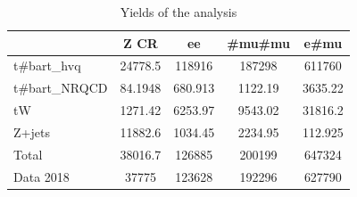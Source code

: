 \documentclass[10pt]{article}
\begin{document}
\begin{table}[htbp]
\begin{center}
\begin{tabular}{|l|S|S|S|S|}
\hline 
 & {Z CR} & {ee} & {#mu#mu} & {e#mu}\\
\hline 
  t#bar{t}_{hvq}   & 24778.5  & 118916  & 187298  & 611760  \\ 
  t#bar{t}_{NRQCD}   & 84.1948  & 680.913  & 1122.19  & 3635.22  \\ 
  tW   & 1271.42  & 6253.97  & 9543.02  & 31816.2  \\ 
  Z+jets   & 11882.6  & 1034.45  & 2234.95  & 112.925  \\ 
\hline 
  Total  & 38016.7  & 126885  & 200199  & 647324  \\ 
\hline 
  Data 2018   & 37775 & 123628 & 192296 & 627790 \\ 
\hline 
\end{tabular} 
\caption{Yields of the analysis} 
\end{center} 
\end{table} 
\end{document}
